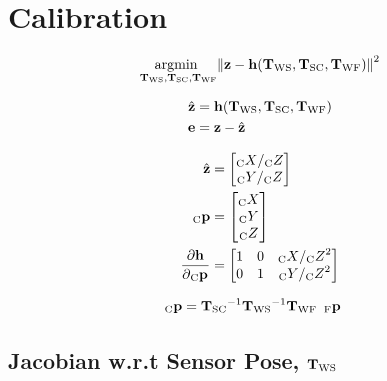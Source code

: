 \chapter{Calibration}

\begin{align}
  \Argmin{\Tf{\world}{\sensor}, \Tf{\sensor}{\cam}, \Tf{\world}{\fiducial}}
  \Norm{
    \measurement
    - \projFunc(\Tf{\world}{\sensor}, \Tf{\sensor}{\cam}, \Tf{\world}{\fiducial})
  }^{2}
\end{align}

\begin{align}
  \hat{\measurement} &=
    \projFunc(\Tf{\world}{\sensor},
              \Tf{\sensor}{\cam},
              \Tf{\world}{\fiducial}) \\
  \Vec{e} &= \measurement - \hat{\measurement}
\end{align}

\begin{align}
  \hat{\measurement}
		&=
			\begin{bmatrix}
				\KineNotationBare{X}{\cam} / \KineNotationBare{Z}{\cam} \\
				\KineNotationBare{Y}{\cam} / \KineNotationBare{Z}{\cam}
			\end{bmatrix} \\
  \Point{\cam}{\fiducial_{i}}
		&=
			\begin{bmatrix}
				\KineNotationBare{X}{\cam} \\
				\KineNotationBare{Y}{\cam} \\
				\KineNotationBare{Z}{\cam}
			\end{bmatrix} \\
  \dfrac{\partial{\projFunc}}{\partial{\Pt{\cam}}}
		&=
			\begin{bmatrix}
				1 & 0 & \KineNotationBare{X}{\cam} / \KineNotationBare{Z}{\cam}^{2} \\
				0 & 1 & \KineNotationBare{Y}{\cam} / \KineNotationBare{Z}{\cam}^{2}
			\end{bmatrix}
\end{align}

\begin{align}
  \Point{\cam}{\fiducial_{ij}}
  &=
  \Tf{\sensor}{\cam}^{-1}
  \Tf{\world}{\sensor}^{-1}
  \Tf{\world}{\fiducial}
  \enspace \Point{\fiducial}{\fiducial_{ij}}
\end{align}



\section{Jacobian w.r.t Sensor Pose, $\Tf{\world}{\sensor}$}

